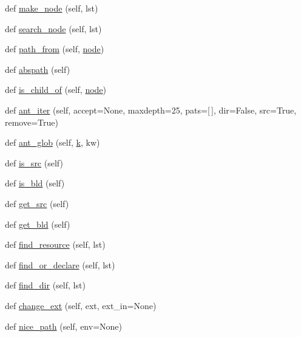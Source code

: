 \begin{DoxyCompactItemize}
def \hyperlink{classwaflib_1_1_node_1_1_node_a347043d52fc2dee925ef027973e01134}{make\+\_\+node} (self, lst)
\item 
def \hyperlink{classwaflib_1_1_node_1_1_node_a67385f1721014aa606e2d7b25687a40f}{search\+\_\+node} (self, lst)
\item 
def \hyperlink{classwaflib_1_1_node_1_1_node_a2994cfc8043e1f27b8873e340a885788}{path\+\_\+from} (self, \hyperlink{structnode}{node})
\item 
def \hyperlink{classwaflib_1_1_node_1_1_node_aa0164267912895aeb986fdbfcf945159}{abspath} (self)
\item 
def \hyperlink{classwaflib_1_1_node_1_1_node_abc781098e2dcdd15feea5901ea2e23af}{is\+\_\+child\+\_\+of} (self, \hyperlink{structnode}{node})
\item 
def \hyperlink{classwaflib_1_1_node_1_1_node_a06da7a2c94996ada3d100721b5cf831e}{ant\+\_\+iter} (self, accept=None, maxdepth=25, pats=\mbox{[}$\,$\mbox{]}, dir=False, src=True, remove=True)
\item 
def \hyperlink{classwaflib_1_1_node_1_1_node_a5d9b6cac9100b15869f68df28f1d8cb4}{ant\+\_\+glob} (self, \hyperlink{rfft2d_test_m_l_8m_adc468c70fb574ebd07287b38d0d0676d}{k}, kw)
\item 
def \hyperlink{classwaflib_1_1_node_1_1_node_ae47c79cf11fd975ccd2a7316eda8b892}{is\+\_\+src} (self)
\item 
def \hyperlink{classwaflib_1_1_node_1_1_node_ac800b56240d593327ff3f3f17c58313d}{is\+\_\+bld} (self)
\item 
def \hyperlink{classwaflib_1_1_node_1_1_node_a7f7ca00eb49c81382a69e032b5229ea6}{get\+\_\+src} (self)
\item 
def \hyperlink{classwaflib_1_1_node_1_1_node_a181e1ee8473df6b270153d1b071d4dc0}{get\+\_\+bld} (self)
\item 
def \hyperlink{classwaflib_1_1_node_1_1_node_a72b22d40cbdffb458638abb21d706ff8}{find\+\_\+resource} (self, lst)
\item 
def \hyperlink{classwaflib_1_1_node_1_1_node_aca7db00cba3cae363d3b5f689ce10828}{find\+\_\+or\+\_\+declare} (self, lst)
\item 
def \hyperlink{classwaflib_1_1_node_1_1_node_a6b0cb5708818ef6483466202ece39049}{find\+\_\+dir} (self, lst)
\item 
def \hyperlink{classwaflib_1_1_node_1_1_node_ad8e6f438a9b4e34994c8ef82c3b7649d}{change\+\_\+ext} (self, ext, ext\+\_\+in=None)
\item 
def \hyperlink{classwaflib_1_1_node_1_1_node_a84dd8d16929674c2a4dadcc078d9d314}{nice\+\_\+path} (self, env=None)

\end{DoxyCompactItemize}
